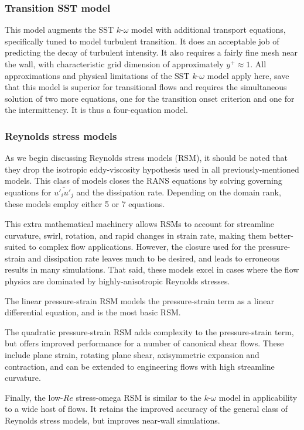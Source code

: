 \documentclass[11pt]{article}
\begin{document}
\subsubsection{Transition SST model}

This model augments the SST $k$-$\omega$ model with additional transport equations, specifically tuned to model turbulent transition. It does an acceptable job of predicting the decay of turbulent intensity. It also requires a fairly fine mesh near the wall, with characteristic grid dimension of approximately $y^+ \approx 1$. All approximations and physical limitations of the SST $k$-$\omega$ model apply here, save that this model is superior for transitional flows and requires the simultaneous solution of two more equations, one for the transition onset criterion and one for the intermittency. It is thus a four-equation model.

\subsubsection{Reynolds stress models}

As we begin discussing Reynolds stress models (RSM), it should be noted that they drop the isotropic eddy-viscosity hypothesis used in all previously-mentioned models. This class of models closes the RANS equations by solving governing equations for $\overline{u'_i u'_j}$ and the dissipation rate. Depending on the domain rank, these models employ either 5 or 7 equations.

This extra mathematical machinery allows RSMs to account for streamline curvature, swirl, rotation, and rapid changes in strain rate, making them better-suited to complex flow applications. However, the closure used for the pressure-strain and dissipation rate leaves much to be desired, and leads to erroneous results in many simulations. That said, these models excel in cases where the flow physics are dominated by highly-anisotropic Reynolds stresses.

The linear pressure-strain RSM models the pressure-strain term as a linear differential equation, and is the most basic RSM.

The quadratic pressure-strain RSM adds complexity to the pressure-strain term, but offers improved performance for a number of canonical shear flows. These include plane strain, rotating plane shear, axisymmetric expansion and contraction, and can be extended to engineering flows with high streamline curvature.

Finally, the low-$Re$ stress-omega RSM is similar to the $k$-$\omega$ model in applicability to a wide host of flows. It retains the improved accuracy of the general class of Reynolds stress models, but improves near-wall simulations.
\end{document}
